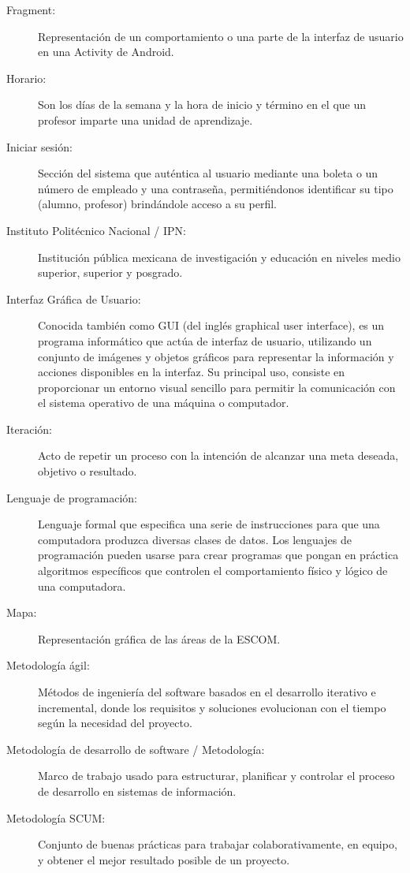 \begin{description}
	\item[Fragment:] Representación de un comportamiento o una parte de la interfaz de usuario en una Activity de Android.
	
	\item[Horario:] Son los días de la semana y la hora de inicio y término en el que un profesor imparte una unidad de aprendizaje.
	
	\item[Iniciar sesión:] Sección del sistema que auténtica al usuario mediante una boleta o un número de empleado y una contraseña, permitiéndonos identificar su tipo (alumno, profesor) brindándole acceso a su perfil.
	\item[Instituto Politécnico Nacional / IPN:] Institución pública mexicana de investigación y educación en niveles medio superior, superior y posgrado.
	\item[Interfaz Gráfica de Usuario:] Conocida también como GUI (del inglés graphical user interface), es un programa informático que actúa de interfaz de usuario, utilizando un conjunto de imágenes y objetos gráficos para representar la información y acciones disponibles en la interfaz. Su principal uso, consiste en proporcionar un entorno visual sencillo para permitir la comunicación con el sistema operativo de una máquina o computador.
	\item[Iteración:] Acto de repetir un proceso con la intención de alcanzar una meta deseada, objetivo o resultado.
	
	\item[Lenguaje de programación:] Lenguaje formal que especifica una serie de instrucciones para que una computadora produzca diversas clases de datos. Los lenguajes de programación pueden usarse para crear programas que pongan en práctica algoritmos específicos que controlen el comportamiento físico y lógico de una computadora.

	\item[Mapa:] Representación gráfica de las áreas de la ESCOM.
	\item[Metodología ágil:] Métodos de ingeniería del software basados en el desarrollo iterativo e incremental, donde los requisitos y soluciones evolucionan con el tiempo según la necesidad del proyecto.
	\item[Metodología de desarrollo de software / Metodología:] Marco de trabajo usado para estructurar, planificar y controlar el proceso de desarrollo en sistemas de información.
	\item[Metodología SCUM:] Conjunto de buenas prácticas para trabajar colaborativamente, en equipo, y obtener el mejor resultado posible de un proyecto. 
	

\end{description}
